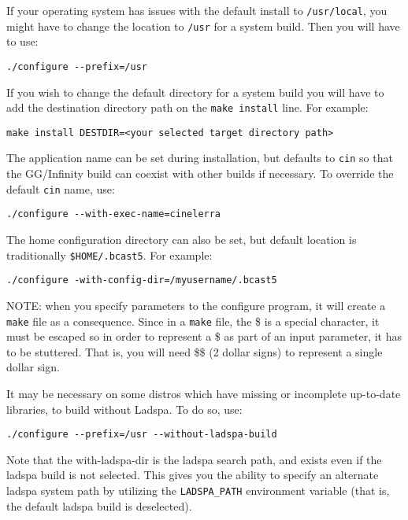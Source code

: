 If your operating system has issues with the default install to
\texttt{/usr/local}, you might have to change the location to
\texttt{/usr} for a system build.  Then you will have to use:
\begin{lstlisting}[style=sh]
./configure --prefix=/usr
\end{lstlisting}

If you wish to change the default directory for a system build you
will have to add the destination directory path on the \texttt{make
  install} line.  For example:
\begin{lstlisting}[style=sh]
make install DESTDIR=<your selected target directory path>
\end{lstlisting}

The application name can be set during installation, but defaults to
\texttt{cin} so that the GG/Infinity build can coexist with other
\CGG{} builds if necessary.  To override the default \texttt{cin}
name, use:
\begin{lstlisting}[style=sh]
./configure --with-exec-name=cinelerra
\end{lstlisting}

The home configuration directory can also be set, but default
location is traditionally \texttt{\$HOME/.bcast5}.  For example:

\begin{lstlisting}[style=sh]
./configure -with-config-dir=/myusername/.bcast5
\end{lstlisting}

NOTE: when you specify parameters to the configure program, it will
create a \texttt{make} file as a consequence.  Since in a
\texttt{make} file, the \$ is a special character, it must be
escaped so in order to represent a \$ as part of an input parameter,
it has to be stuttered.  That is, you will need \$\$ (2 dollar
signs) to represent a single dollar sign.

It may be necessary on some distros which have missing or incomplete
up-to-date libraries, to build \CGG{} without Ladspa.  To do so,
use:

\begin{lstlisting}[style=sh]
./configure --prefix=/usr --without-ladspa-build
\end{lstlisting}

Note that the with-ladspa-dir is the ladspa search path, and
exists even if the ladspa build is not selected.  This gives you
the ability to specify an alternate ladspa system path by
utilizing the \texttt{LADSPA\_PATH} environment variable (that is,
the default ladspa build is deselected).

